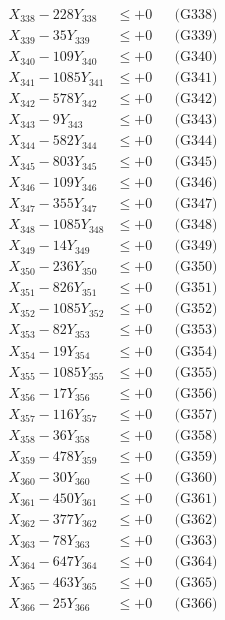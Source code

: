 \documentclass[a4paper,10pt]{article}
\begin{document}
{\begin{align}
X_{338} - 228Y_{338} &\leq +0 && \text{(G338)} \\
X_{339} - 35Y_{339} &\leq +0 && \text{(G339)} \\
X_{340} - 109Y_{340} &\leq +0 && \text{(G340)} \\
\allowbreak
X_{341} - 1085Y_{341} &\leq +0 && \text{(G341)} \\
X_{342} - 578Y_{342} &\leq +0 && \text{(G342)} \\
X_{343} - 9Y_{343} &\leq +0 && \text{(G343)} \\
X_{344} - 582Y_{344} &\leq +0 && \text{(G344)} \\
X_{345} - 803Y_{345} &\leq +0 && \text{(G345)} \\
X_{346} - 109Y_{346} &\leq +0 && \text{(G346)} \\
X_{347} - 355Y_{347} &\leq +0 && \text{(G347)} \\
X_{348} - 1085Y_{348} &\leq +0 && \text{(G348)} \\
X_{349} - 14Y_{349} &\leq +0 && \text{(G349)} \\
X_{350} - 236Y_{350} &\leq +0 && \text{(G350)} \\
\allowbreak
X_{351} - 826Y_{351} &\leq +0 && \text{(G351)} \\
X_{352} - 1085Y_{352} &\leq +0 && \text{(G352)} \\
X_{353} - 82Y_{353} &\leq +0 && \text{(G353)} \\
X_{354} - 19Y_{354} &\leq +0 && \text{(G354)} \\
X_{355} - 1085Y_{355} &\leq +0 && \text{(G355)} \\
X_{356} - 17Y_{356} &\leq +0 && \text{(G356)} \\
X_{357} - 116Y_{357} &\leq +0 && \text{(G357)} \\
X_{358} - 36Y_{358} &\leq +0 && \text{(G358)} \\
X_{359} - 478Y_{359} &\leq +0 && \text{(G359)} \\
X_{360} - 30Y_{360} &\leq +0 && \text{(G360)} \\
\allowbreak
X_{361} - 450Y_{361} &\leq +0 && \text{(G361)} \\
X_{362} - 377Y_{362} &\leq +0 && \text{(G362)} \\
X_{363} - 78Y_{363} &\leq +0 && \text{(G363)} \\
X_{364} - 647Y_{364} &\leq +0 && \text{(G364)} \\
X_{365} - 463Y_{365} &\leq +0 && \text{(G365)} \\
X_{366} - 25Y_{366} &\leq +0 && \text{(G366)} \\

\end{align}}
\end{document}
